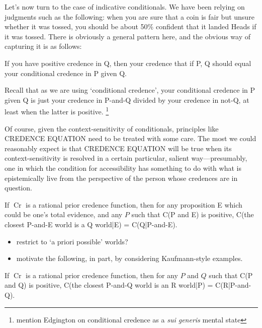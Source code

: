 \documentclass[leqno, 11pt, a5paper, openany]{article}
\DeclareMathOperator{\prior}{Cr}
\begin{document}
Let's now turn to the case of indicative conditionals. We have been relying on judgments such as the following: when you are sure that a coin is fair but unsure whether it was tossed, you should be about 50\% confident that it landed Heads if it was tossed. There is obviously a general pattern here, and the obvious way of capturing it is as follows:
\begin{prop}
	 \label{credenceq}
	If you have positive credence in Q, then your credence that if P, Q should equal your conditional credence in P given Q. 
\end{prop}

Recall that as we are using ‘conditional credence’, your conditional credence in P given Q is just your credence in P-and-Q divided by your credence in not-Q, at least when the latter is positive.%
\footnote{mention Edgington on conditional credence as a \emph{sui generis} mental state}

Of course, given the context-sensitivity of conditionals, principles like CREDENCE EQUATION need to be treated with some care. The most we could reasonably expect is that CREDENCE EQUATION will be true when its context-sensitivity is resolved in a certain particular, salient way---presumably, one in which the condition for accessibility has something to do with what is epistemically live from the perspective of the person whose credences are in question.

\begin{prop}
	If $\prior$ is a rational prior credence function, then for any proposition E which could be one's total evidence, and any $P$ such that C(P and E) is positive, C(the closest P-and-E world is a Q world|E) = C(Q|P-and-E). 
\end{prop}

\begin{itemize}
\item
  restrict to ‘a priori possible’ worlds?
\item
  motivate the following, in part, by considering Kaufmann-style
  examples.
\end{itemize}

\begin{prop}
	If $\prior$ is a rational prior credence function, then for any $P$ and $Q$ such that C(P and Q) is positive, C(the closest P-and-Q world is an R world|P) = C(R|P-and-Q). 
\end{prop}
\end{document}
